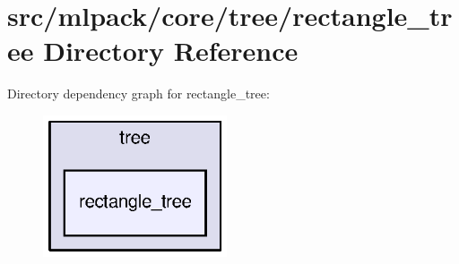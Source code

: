 \section{src/mlpack/core/tree/rectangle\+\_\+tree Directory Reference}
\label{dir_7919cd971787b4fc956a50aa3613ed0a}
Directory dependency graph for rectangle\+\_\+tree\+:
\nopagebreak
\begin{figure}[H]
\begin{center}
\leavevmode
\includegraphics[width=154pt]{dir_7919cd971787b4fc956a50aa3613ed0a_dep}
\end{center}
\end{figure}
